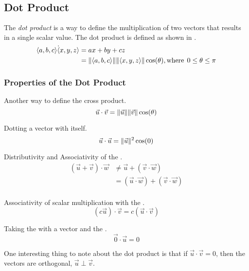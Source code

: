\subsection{Dot Product}\label{subsec:Vector_Dot_Product}
\begin{definition}\label{def:Dot_Product}
  The \emph{dot product} is a way to define the multiplication of two vectors that results in a single scalar value.
  The dot product is defined as shown in .
  \begin{equation}\label{eq:Dot_Product}
    \begin{aligned}
      \langle a, b, c \rangle \dot \langle x, y, z \rangle &= ax + by + cz \\
      &= \lVert \langle a, b, c \rangle \rVert \lVert \langle x, y, z \rangle \rVert \cos(\theta), \text{where} \:\: 0 \leq \theta \leq \pi \\
    \end{aligned}
  \end{equation}
\end{definition}

\subsubsection{Properties of the Dot Product}\label{subsubsec:Dot_Product_Properties}
\begin{propertylist}
\item Another way to define the cross product.\label{prop:Dot_Product_Magnitude_Angle}
  \begin{equation*}
    \vec{u} \cdot \vec{v} = \lVert \vec{u} \rVert \lVert \vec{v} \rVert \cos(\theta)
  \end{equation*}
\item Dotting a vector with itself.
  \begin{equation*}
    \vec{u} \cdot \vec{u} = \lVert \vec{u} \rVert^{2} \cos(0)
  \end{equation*}
\item Distributivity and Associativity of the .
  \begin{equation*}
    \begin{aligned}
      (\vec{u} + \vec{v}) \cdot \vec{w} &\neq \vec{u} + (\vec{v} \cdot \vec{w}) \\
      &= (\vec{u} \cdot \vec{w}) + (\vec{v} \cdot \vec{w}) \\
    \end{aligned}
  \end{equation*}
\item Associativity of scalar multiplication with the .
  \begin{equation*}
    (c \vec{u}) \cdot \vec{v} = c(\vec{u} \cdot \vec{v})
  \end{equation*}
\item Taking the  with a vector and the .
  \begin{equation*}
    \vec{0} \cdot \vec{u} = 0
  \end{equation*}
\end{propertylist}

One interesting thing to note about the dot product is that if $\vec{u} \cdot \vec{v} = 0$, then the vectors are orthogonal, $\vec{u} \perp \vec{v}$.


